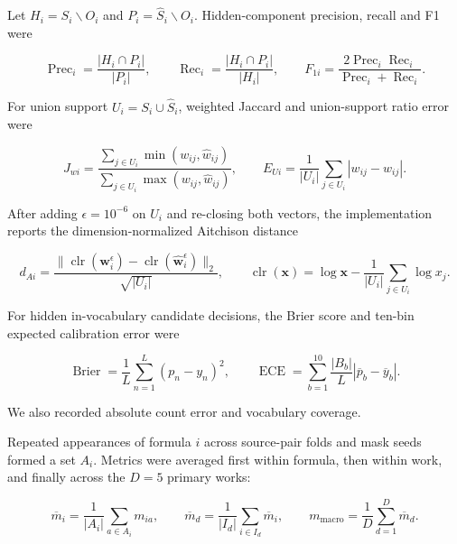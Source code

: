 \documentclass[11pt]{article}
\begin{document}
Let \(H_i=S_i\mathbin{\backslash} O_i\) and \(P_i=\widehat S_i\mathbin{\backslash} O_i\). Hidden-component precision, recall and F1 were

\begin{equation}
\label{eq:set-metrics}
\operatorname{Prec}_i=\frac{|H_i\cap P_i|}{|P_i|},\qquad \operatorname{Rec}_i=\frac{|H_i\cap P_i|}{|H_i|},\qquad F_{1i}=\frac{2\operatorname{Prec}_i\operatorname{Rec}_i}{\operatorname{Prec}_i+\operatorname{Rec}_i}.
\end{equation}

For union support \(U_i=S_i\cup\widehat S_i\), weighted Jaccard and union-support ratio error were

\begin{equation}
\label{eq:composition-metrics}
J_{wi}=\frac{\sum_{j\in U_i}\min(w_{ij},\widehat w_{ij})}{\sum_{j\in U_i}\max(w_{ij},\widehat w_{ij})},\qquad E_{Ui}=\frac{1}{|U_i|}\sum_{j\in U_i}|w_{ij}-\widehat w_{ij}|.
\end{equation}

After adding \(\epsilon=10^{-6}\) on \(U_i\) and re-closing both vectors, the implementation reports the dimension-normalized Aitchison distance \cite{ref19}

\begin{equation}
\label{eq:aitchison-distance}
d_{Ai}=\frac{\|\operatorname{clr}(\mathbf w_i^{\epsilon})-\operatorname{clr}(\widehat{\mathbf w}_i^{\epsilon})\|_2}{\sqrt{|U_i|}},\qquad \operatorname{clr}(\mathbf x)=\log\mathbf x-\frac{1}{|U_i|}\sum_{j\in U_i}\log x_j.
\end{equation}

For hidden in-vocabulary candidate decisions, the Brier score and ten-bin expected calibration error were

\begin{equation}
\label{eq:calibration-metrics}
\operatorname{Brier}=\frac{1}{L}\sum_{n=1}^{L}(p_n-y_n)^2,\qquad \operatorname{ECE}=\sum_{b=1}^{10}\frac{|B_b|}{L}\left|\overline p_b-\overline y_b\right|.
\end{equation}

We also recorded absolute count error and vocabulary coverage.

Repeated appearances of formula \(i\) across source-pair folds and mask seeds formed a set \(A_i\). Metrics were averaged first within formula, then within work, and finally across the \(D=5\) primary works:

\begin{equation}
\label{eq:source-macro}
\overline m_i=\frac{1}{|A_i|}\sum_{a\in A_i}m_{ia},\qquad \overline m_d=\frac{1}{|I_d|}\sum_{i\in I_d}\overline m_i,\qquad m_{\mathrm{macro}}=\frac{1}{D}\sum_{d=1}^{D}\overline m_d.
\end{equation}
\end{document}
